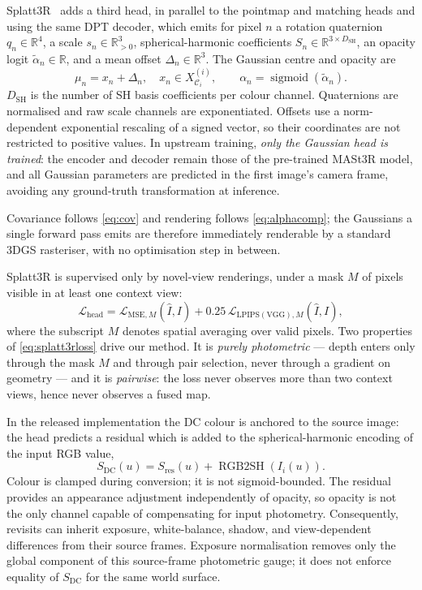 Splatt3R~\cite{smart2024splatt3r} adds a third head, in parallel to the
pointmap and matching heads and using the same DPT decoder, which emits for
pixel $n$ a rotation quaternion $q_n\in\mathbb{R}^4$, a scale
$s_n\in\mathbb{R}_{>0}^3$, spherical-harmonic coefficients
$S_n\in\mathbb{R}^{3\times D_{\mathrm{SH}}}$, an opacity logit
$\widetilde\alpha_n\in\mathbb{R}$, and a mean offset
$\Delta_n\in\mathbb{R}^3$. The Gaussian centre and opacity are
\begin{equation}
\mu_n=x_n+\Delta_n,\quad x_n\in X_{\mathcal C_i}^{(i)},\qquad
\alpha_n=\operatorname{sigmoid}(\widetilde\alpha_n).
\label{eq:mu}
\end{equation}
$D_{\mathrm{SH}}$ is the number of SH basis coefficients per colour channel.
Quaternions are normalised and raw scale channels are exponentiated.
Offsets use a norm-dependent exponential rescaling of a signed vector, so their coordinates
are not restricted to positive values. In upstream training, \emph{only the Gaussian
head is trained}: the encoder and decoder remain those of the pre-trained
MASt3R model, and all Gaussian parameters are predicted in the first image's
camera frame, avoiding any ground-truth transformation at inference.

Covariance follows \cref{eq:cov} and rendering follows
\cref{eq:alphacomp}; the Gaussians a single forward pass emits are therefore
immediately renderable by a standard 3DGS rasteriser, with no optimisation
step in between.

Splatt3R is supervised only by novel-view renderings, under a mask $M$ of
pixels visible in at least one context view:
\begin{equation}
\mathcal{L}_{\mathrm{head}}
  =\mathcal{L}_{\mathrm{MSE},M}(\hat I,I)
  +0.25\,\mathcal{L}_{\mathrm{LPIPS(VGG)},M}(\hat I,I),
\label{eq:splatt3rloss}
\end{equation}
where the subscript $M$ denotes spatial averaging over valid pixels.
Two properties of \cref{eq:splatt3rloss} drive our method.
It is \emph{purely photometric} ---
depth enters only through the mask $M$ and through pair selection, never
through a gradient on geometry --- and it is \emph{pairwise}: the loss never
observes more than two context views, hence never observes a fused map.

In the released implementation the DC colour is anchored to the source image:
the head predicts a residual which is added to the spherical-harmonic encoding
of the input RGB value,
\begin{equation}
S_{\mathrm{DC}}(u)=S_{\mathrm{res}}(u)+\operatorname{RGB2SH}(I_i(u)).
\label{eq:colorresidual}
\end{equation}
Colour is clamped during conversion; it is not sigmoid-bounded. The residual
provides an appearance adjustment independently of opacity, so opacity is
not the only channel capable of compensating for input photometry.
Consequently, revisits can inherit exposure, white-balance, shadow, and
view-dependent differences from their source frames. Exposure normalisation
removes only the global component of this source-frame photometric gauge; it
does not enforce equality of $S_{\mathrm{DC}}$ for the same world surface.
